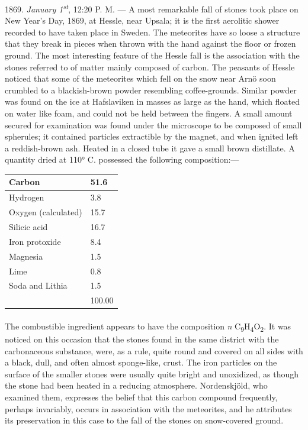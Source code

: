 \documentclass[a4paper, 11pt, oneside, english]{article}
\begin{document}
1869. \emph{January 1\textsuperscript{st}}, 12:20 P. M. --- A most remarkable fall of stones took place on New Year's Day, 1869, at Hessle, near Upsala; it is the first aerolitic shower recorded to have taken place in Sweden. The meteorites have so loose a structure that they break in pieces when thrown with the hand against the floor or frozen ground. The most interesting feature of the Hessle fall is the association with the stones referred to of matter mainly composed of carbon. The peasants of Hessle noticed that some of the meteorites which fell on the snow near Arnö soon crumbled to a blackish-brown powder resembling coffee-grounds. Similar powder was found on the ice at Hafslaviken in masses as large as the hand, which floated on water like foam, and could not be held between the fingers. A small amount secured for examination was found under the microscope to be composed of small spherules; it contained particles extractible by the magnet, and when ignited left a reddish-brown ash. Heated in a closed tube it gave a small brown distillate. A quantity dried at 110° C. possessed the following composition:---
\begin{table}[H]
    \centering
    \begin{tabular}{|l|l|}
    \hline
        Carbon & 51.6 \\ \hline
        Hydrogen & 3.8 \\ \hline
        Oxygen (calculated) & 15.7 \\ \hline
        Silicic acid & 16.7 \\ \hline
        Iron protoxide & 8.4 \\ \hline
        Magnesia & 1.5 \\ \hline
        Lime & 0.8 \\ \hline
        Soda and Lithia & 1.5 \\ \hline
        ~ & 100.00 \\ \hline
    \end{tabular}
\end{table}
\paragraph{}
The combustible ingredient appears to have the composition \emph{n} C\textsubscript{9}H\textsubscript{4}O\textsubscript{2}. It was noticed on this occasion that the stones found in the same district with the carbonaceous substance, were, as a rule, quite round and covered on all sides with a black, dull, and often almost sponge-like, crust. The iron particles on the surface of the smaller stones were usually quite bright and unoxidized, as though the stone had been heated in a reducing atmosphere. Nordenskjöld, who examined them, expresses the belief that this carbon compound frequently, perhaps invariably, occurs in association with the meteorites, and he attributes its preservation in this case to the fall of the stones on snow-covered ground.
\end{document}
